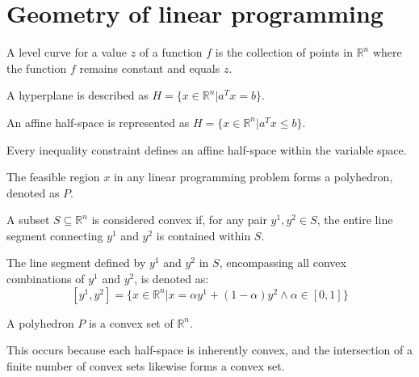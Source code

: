 \section{Geometry of linear programming}

\begin{definition}
    A level curve for a value $z$ of a function $f$ is the collection of points in $\mathbb{R}^n$  where the function $f$ remains constant and equals $z$.
\end{definition}
\begin{definition}
    A hyperplane is described as $H=\{x \in \mathbb{R}^n|a^Tx=b\}$. 
\end{definition}
\begin{definition}    
    An affine half-space is represented as $H=\{x \in \mathbb{R}^n|a^Tx \leq b\}$. 
\end{definition}
Every inequality constraint defines an affine half-space within the variable space.
\begin{definition}
    The feasible region $x$  in any linear programming problem forms a polyhedron, denoted as $P$. 
\end{definition}
\begin{definition}
    A subset $S \subseteq \mathbb{R}^n$ is considered convex if, for any pair $y^1,y^2 \in S$, the entire line segment connecting $y^1$ and $y^2$ is contained within $S$. 
\end{definition}
\begin{definition}
    The line segment defined by $y^1$ and $y^2 $ in $ S$, encompassing all convex combinations of $y^1$ and $y^2$, is denoted as:
    \[[y^1,y^2]=\{x \in \mathbb{R}^n|x=\alpha y^1+(1-\alpha)y^2 \land \alpha \in [0,1]\} \]
\end{definition}
\begin{property}
    A polyhedron $P$ is a convex set of $\mathbb{R}^n$. 
\end{property}
This occurs because each half-space is inherently convex, and the intersection of a finite number of convex sets likewise forms a convex set.

